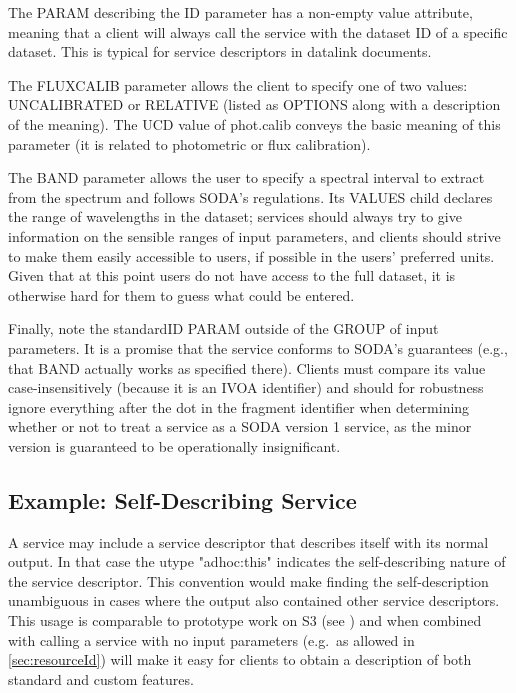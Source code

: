 \documentclass[11pt,a4paper]{ivoa}
\begin{document}
The PARAM describing the ID parameter has a non-empty value attribute,
meaning that a client will always call the service with the dataset ID
of a specific dataset.  This is typical for service descriptors in
datalink documents.

The FLUXCALIB parameter allows the client to specify one of two values:
UNCALIBRATED or RELATIVE (listed as OPTIONS along with a description of
the meaning). The UCD \citep{2005ivoa.spec.0819D} value
of phot.calib conveys the basic meaning
of this parameter (it is related to photometric or flux calibration).

The BAND parameter allows the user to specify a spectral interval to
extract from the spectrum and follows SODA's regulations.  Its VALUES
child declares the range of wavelengths in the dataset; services should
always try to give information on the sensible ranges of input
parameters, and clients should strive to make them easily accessible to
users, if possible in the users' preferred units.  Given that at this
point users do not have access to the full dataset, it is otherwise hard
for them to guess what could be entered.

Finally, note the standardID PARAM outside of the GROUP of input
parameters.  It is a promise that the service conforms to SODA's
guarantees (e.g., that BAND actually works as specified there).  Clients
must compare its value case-insensitively (because it is an IVOA
identifier) and should for robustness ignore everything after the dot in
the fragment identifier when determining whether or not to treat a
service as a SODA version 1 service, as the minor version is guaranteed
to be operationally insignificant.


\subsection{Example: Self-Describing Service}
\label{sec:selfDescribing}

A service may include a service descriptor that describes itself with
its normal output. In that case the utype "adhoc:this" indicates the self-describing
nature of the service descriptor. This convention would make finding the self-description
unambiguous in cases where the output also contained other service
descriptors.
   This usage is comparable to prototype work on S3
(see \citet{note:s3})
and when combined with calling a service with no input parameters
(e.g.\ as allowed in \ref{sec:resourceId})
will make it easy for clients to obtain a
description of both standard and custom features.
\end{document}
